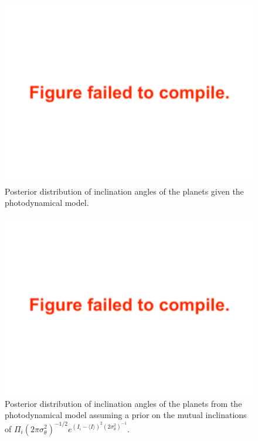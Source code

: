 \documentclass[twocolumn]{aastex63}
\begin{document}
\begin{figure}
    \centering
    \includegraphics[width=\hsize]{figures/inclination_noprior.pdf}
    {Posterior distribution of inclination angles of the planets given
        the photodynamical model.}
    \label{fig:inclination_distribution}
\end{figure}

\begin{figure}
    \centering
    \includegraphics[width=\hsize]{figures/inclination_nouprior_incprior.pdf}
    {Posterior distribution of inclination angles of the planets from the photodynamical model assuming
        a prior on the mutual inclinations of $\Pi_i (2\pi\sigma_\theta^2)^{-1/2} e^{(I_i-\langle I\rangle)^2(2\sigma_\theta^2)^{-1}}$.}
    \label{fig:inclination_prior}
\end{figure}
\end{document}

